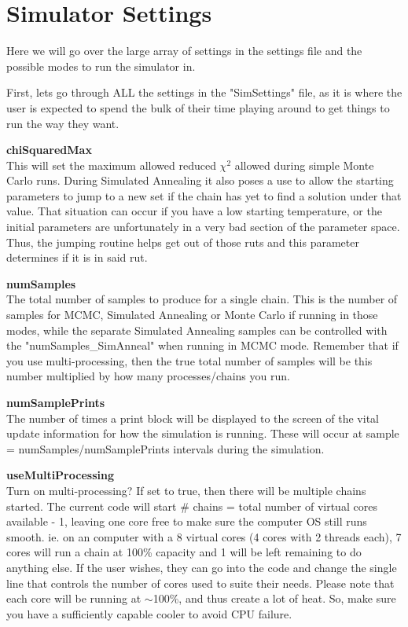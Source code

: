 \documentclass[12pt,preprint]{aastex}
\begin{document}
\pagebreak


\section{Simulator Settings}

Here we will go over the large array of settings in the settings file and the possible modes to run the simulator in.

First, lets go through ALL the settings in the "SimSettings" file, as it is where the user is expected to spend the bulk of their time playing around to get things to run the way they want.

{\bf chiSquaredMax}\\
This will set the maximum allowed reduced $\chi^2$ allowed during simple Monte Carlo runs.  During Simulated Annealing it also poses a use to allow the starting parameters to jump to a new set if the chain has yet to find a solution under that value.  That situation can occur if you have a low starting temperature, or the initial parameters are unfortunately in a very bad section of the parameter space.  Thus, the jumping routine helps get out of those ruts and this parameter determines if it is in said rut.

{\bf numSamples}\\
The total number of samples to produce for a single chain.  This is the number of samples for MCMC, Simulated Annealing or Monte Carlo if running in those modes, while the separate Simulated Annealing samples can be controlled with the "numSamples\_SimAnneal" when running in MCMC mode.  Remember that if you use multi-processing, then the true total number of samples will be this number multiplied by how many processes/chains you run.

{\bf numSamplePrints}\\
The number of times a print block will be displayed to the screen of the vital update information for how the simulation is running.  These will occur at sample = numSamples/numSamplePrints intervals during the simulation.

{\bf useMultiProcessing}\\
Turn on multi-processing?  If set to true, then there will be multiple chains started.  The current code will start \# chains = total number of virtual cores available - 1, leaving one core free to make sure the computer OS still runs smooth. ie. on an computer with a 8 virtual cores (4 cores with 2 threads each), 7 cores will run a chain at 100\% capacity and 1 will be left remaining to do anything else.  If the user wishes, they can go into the code and change the single line that controls the number of cores used to suite their needs.  Please note that each core will be running at $\sim$100\%, and thus create a lot of heat.  So, make sure you have a sufficiently capable cooler to avoid CPU failure.
\end{document}
